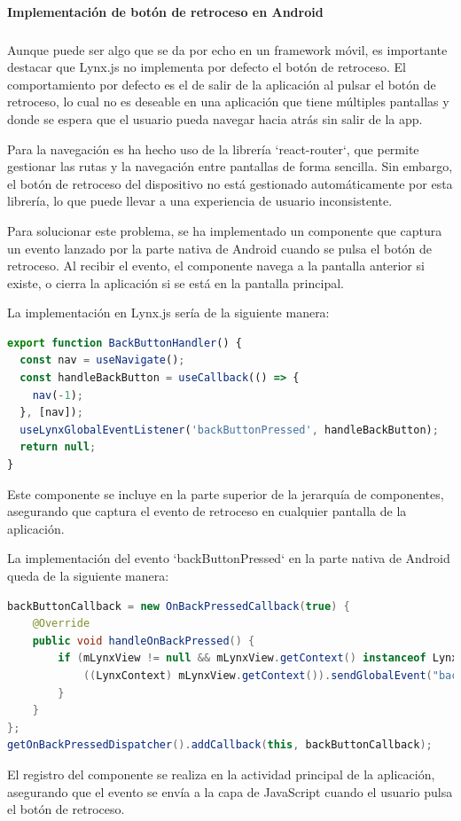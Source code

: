 \paragraph{Implementación de botón de retroceso en Android}
\subparagraph{}
Aunque puede ser algo que se da por echo en un framework móvil, es importante destacar que Lynx.js no implementa por defecto el botón de retroceso.
El comportamiento por defecto es el de salir de la aplicación al pulsar el botón de retroceso, lo cual no es deseable en una aplicación que tiene múltiples pantallas y donde se espera que el usuario pueda navegar hacia atrás sin salir de la app.

Para la navegación es ha hecho uso de la librería `react-router`, que permite gestionar las rutas y la navegación entre pantallas de forma sencilla.
Sin embargo, el botón de retroceso del dispositivo no está gestionado automáticamente por esta librería, lo que puede llevar a una experiencia de usuario inconsistente.

Para solucionar este problema, se ha implementado un componente que captura un evento lanzado por la parte nativa de Android cuando se pulsa el botón de retroceso.
Al recibir el evento, el componente navega a la pantalla anterior si existe, o cierra la aplicación si se está en la pantalla principal.

La implementación en Lynx.js sería de la siguiente manera:
\begin{lstlisting}[language=typescript, caption={Implementación del botón de retroceso en Lynx.js}]
export function BackButtonHandler() {
  const nav = useNavigate();
  const handleBackButton = useCallback(() => {
    nav(-1);
  }, [nav]);
  useLynxGlobalEventListener('backButtonPressed', handleBackButton);
  return null;
}
\end{lstlisting}
Este componente se incluye en la parte superior de la jerarquía de componentes, asegurando que captura el evento de retroceso en cualquier pantalla de la aplicación.

La implementación del evento `backButtonPressed` en la parte nativa de Android queda de la siguiente manera:
\begin{lstlisting}[language=Java, caption={Implementación del evento de botón de retroceso en Android}]
backButtonCallback = new OnBackPressedCallback(true) {
    @Override
    public void handleOnBackPressed() {
        if (mLynxView != null && mLynxView.getContext() instanceof LynxContext) {
            ((LynxContext) mLynxView.getContext()).sendGlobalEvent("backButtonPressed", null);
        }
    }
};
getOnBackPressedDispatcher().addCallback(this, backButtonCallback);
\end{lstlisting}
El registro del componente se realiza en la actividad principal de la aplicación, asegurando que el evento se envía a la capa de JavaScript cuando el usuario pulsa el botón de retroceso.

